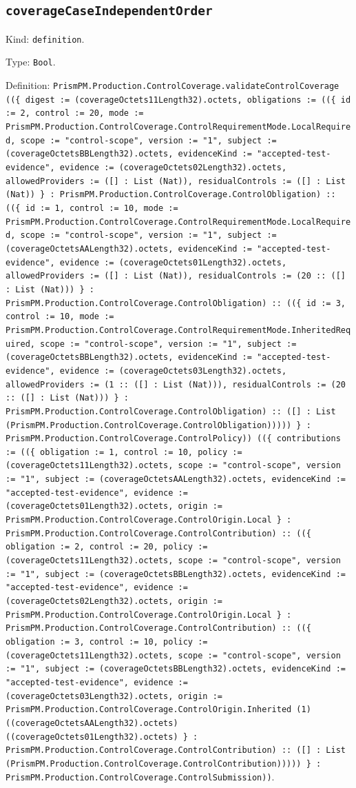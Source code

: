 \documentclass[11pt]{article}
\begin{document}
\subsection*{\texttt{coverageCaseIndependentOrder}}
\noindent Kind: \texttt{definition}.\par
\noindent Type: \texttt{Bool}.\par
\noindent Definition: \texttt{PrismPM.Production.ControlCoverage.validateControlCoverage ((\{ digest := (coverageOctets11Length32).octets, obligations := ((\{ id := 2, control := 20, mode := PrismPM.Production.ControlCoverage.ControlRequirementMode.LocalRequired, scope := "control-scope", version := "1", subject := (coverageOctetsBBLength32).octets, evidenceKind := "accepted-test-evidence", evidence := (coverageOctets02Length32).octets, allowedProviders := ([] : List (Nat)), residualControls := ([] : List (Nat)) \} : PrismPM.Production.ControlCoverage.ControlObligation) :: ((\{ id := 1, control := 10, mode := PrismPM.Production.ControlCoverage.ControlRequirementMode.LocalRequired, scope := "control-scope", version := "1", subject := (coverageOctetsAALength32).octets, evidenceKind := "accepted-test-evidence", evidence := (coverageOctets01Length32).octets, allowedProviders := ([] : List (Nat)), residualControls := (20 :: ([] : List (Nat))) \} : PrismPM.Production.ControlCoverage.ControlObligation) :: ((\{ id := 3, control := 10, mode := PrismPM.Production.ControlCoverage.ControlRequirementMode.InheritedRequired, scope := "control-scope", version := "1", subject := (coverageOctetsBBLength32).octets, evidenceKind := "accepted-test-evidence", evidence := (coverageOctets03Length32).octets, allowedProviders := (1 :: ([] : List (Nat))), residualControls := (20 :: ([] : List (Nat))) \} : PrismPM.Production.ControlCoverage.ControlObligation) :: ([] : List (PrismPM.Production.ControlCoverage.ControlObligation))))) \} : PrismPM.Production.ControlCoverage.ControlPolicy)) ((\{ contributions := ((\{ obligation := 1, control := 10, policy := (coverageOctets11Length32).octets, scope := "control-scope", version := "1", subject := (coverageOctetsAALength32).octets, evidenceKind := "accepted-test-evidence", evidence := (coverageOctets01Length32).octets, origin := PrismPM.Production.ControlCoverage.ControlOrigin.Local \} : PrismPM.Production.ControlCoverage.ControlContribution) :: ((\{ obligation := 2, control := 20, policy := (coverageOctets11Length32).octets, scope := "control-scope", version := "1", subject := (coverageOctetsBBLength32).octets, evidenceKind := "accepted-test-evidence", evidence := (coverageOctets02Length32).octets, origin := PrismPM.Production.ControlCoverage.ControlOrigin.Local \} : PrismPM.Production.ControlCoverage.ControlContribution) :: ((\{ obligation := 3, control := 10, policy := (coverageOctets11Length32).octets, scope := "control-scope", version := "1", subject := (coverageOctetsBBLength32).octets, evidenceKind := "accepted-test-evidence", evidence := (coverageOctets03Length32).octets, origin := PrismPM.Production.ControlCoverage.ControlOrigin.Inherited (1) ((coverageOctetsAALength32).octets) ((coverageOctets01Length32).octets) \} : PrismPM.Production.ControlCoverage.ControlContribution) :: ([] : List (PrismPM.Production.ControlCoverage.ControlContribution))))) \} : PrismPM.Production.ControlCoverage.ControlSubmission))}.\par
\end{document}
